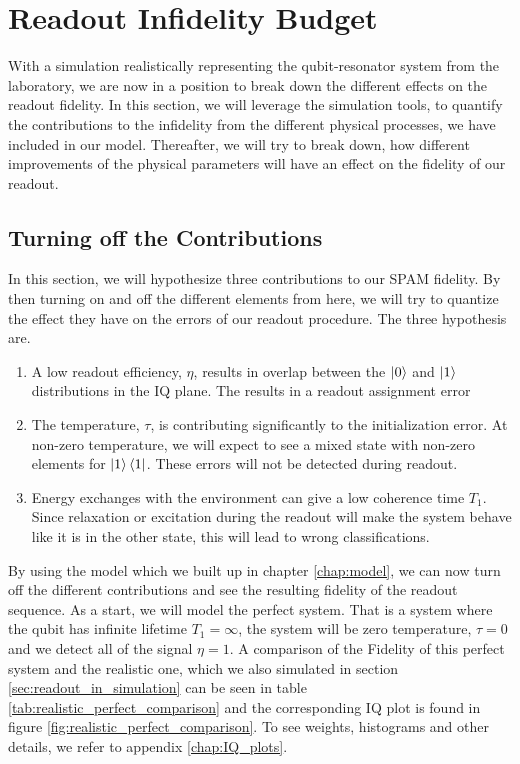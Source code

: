 \chapter{Readout Infidelity Budget} \label{chap:budget}
With a simulation realistically representing the qubit-resonator system from the laboratory, we are now in a position to break down the different effects on the readout fidelity. In this section, we will leverage the simulation tools, to quantify the contributions to the infidelity from the different physical processes, we have included in our model. Thereafter, we will try to break down, how different improvements of the physical parameters will have an effect on the fidelity of our readout. 
\section{Turning off the Contributions}
In this section, we will hypothesize three contributions to our SPAM fidelity. By then turning on and off the different elements from here, we will try to quantize the effect they have on the errors of our readout procedure. The three hypothesis are.
\begin{enumerate}
    \item A low readout efficiency, $\eta$, results in overlap between the $\ket{0}$ and $\ket{1}$ distributions in the IQ plane. The results in a readout assignment error 
    \item The temperature, $\tau$, is contributing significantly to the initialization error. At non-zero temperature, we will expect to see a mixed state with non-zero elements for $\ket{1}\bra{1}$. These errors will not be detected during readout. 
    \item Energy exchanges with the environment can give a low coherence time $T_1$. Since relaxation or excitation during the readout will make the system behave like it is in the other state, this will lead to wrong classifications.
\end{enumerate}
By using the model which we built up in chapter \ref{chap:model}, we can now turn off the different contributions and see the resulting fidelity of the readout sequence. As a start, we will model the perfect system. That is a system where the qubit has infinite lifetime $T_1 = \infty$, the system will be zero temperature, $\tau = 0$ and we detect all of the signal $\eta = 1$. A comparison of the Fidelity of this perfect system and the realistic one, which we also simulated in section \ref{sec:readout_in_simulation} can be seen in table \ref{tab:realistic_perfect_comparison} and the corresponding IQ plot is found in figure \ref{fig:realistic_perfect_comparison}. To see weights, histograms and other details, we refer to appendix \ref{chap:IQ_plots}.


